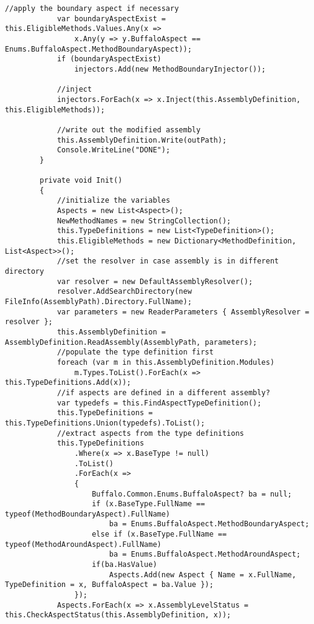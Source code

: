 \begin{lstlisting}[caption={../buffalo/Weaver.cs}, label=../buffalo/Weaver.cs, frame=tb, basicstyle=\scriptsize]
            //apply the boundary aspect if necessary
            var boundaryAspectExist = this.EligibleMethods.Values.Any(x =>
                x.Any(y => y.BuffaloAspect == Enums.BuffaloAspect.MethodBoundaryAspect));
            if (boundaryAspectExist)
                injectors.Add(new MethodBoundaryInjector());

            //inject
            injectors.ForEach(x => x.Inject(this.AssemblyDefinition, this.EligibleMethods));

            //write out the modified assembly
            this.AssemblyDefinition.Write(outPath);
            Console.WriteLine("DONE");
        }

        private void Init()
        {
            //initialize the variables
            Aspects = new List<Aspect>();
            NewMethodNames = new StringCollection();
            this.TypeDefinitions = new List<TypeDefinition>();
            this.EligibleMethods = new Dictionary<MethodDefinition, List<Aspect>>();
            //set the resolver in case assembly is in different directory
            var resolver = new DefaultAssemblyResolver();
            resolver.AddSearchDirectory(new FileInfo(AssemblyPath).Directory.FullName);
            var parameters = new ReaderParameters { AssemblyResolver = resolver };
            this.AssemblyDefinition = AssemblyDefinition.ReadAssembly(AssemblyPath, parameters);
            //populate the type definition first
            foreach (var m in this.AssemblyDefinition.Modules)
                m.Types.ToList().ForEach(x => this.TypeDefinitions.Add(x));
            //if aspects are defined in a different assembly?
            var typedefs = this.FindAspectTypeDefinition();
            this.TypeDefinitions = this.TypeDefinitions.Union(typedefs).ToList();
            //extract aspects from the type definitions
            this.TypeDefinitions
                .Where(x => x.BaseType != null)
                .ToList()
                .ForEach(x =>
                {
                    Buffalo.Common.Enums.BuffaloAspect? ba = null;
                    if (x.BaseType.FullName == typeof(MethodBoundaryAspect).FullName)
                        ba = Enums.BuffaloAspect.MethodBoundaryAspect;
                    else if (x.BaseType.FullName == typeof(MethodAroundAspect).FullName)
                        ba = Enums.BuffaloAspect.MethodAroundAspect;
                    if(ba.HasValue)
                        Aspects.Add(new Aspect { Name = x.FullName, TypeDefinition = x, BuffaloAspect = ba.Value });
                });
            Aspects.ForEach(x => x.AssemblyLevelStatus = this.CheckAspectStatus(this.AssemblyDefinition, x));

\end{lstlisting}
